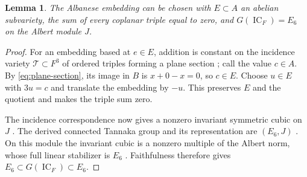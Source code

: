 \documentclass[10pt]{amsart}
\numberwithin{equation}{section}
\newtheorem{lemma}[theorem]{Lemma}
\theoremstyle{remark}
\newcommand{\IC}{\operatorname{IC}}
\newcommand{\cT}{\mathcal T}
\begin{document}
\begin{lemma}\label{lem:normalization}
The Albanese embedding can be chosen with $E\subset A$ an abelian
subvariety, the sum of every coplanar triple equal to zero, and
$G(\IC_F)=E_6$ on the Albert module $J$.
\end{lemma}
\begin{proof}
For an embedding based at $e\in E$, addition is constant on the incidence
variety $\cT\subset F^3$ of ordered triples forming a plane section
\cite{CG1972,Kraemer2022}; call the value $c\in A$.  By
\eqref{eq:plane-section}, its image in $B$ is $x+0-x=0$, so $c\in E$.
Choose $u\in E$ with $3u=c$ and translate the embedding by $-u$.
This preserves $E$ and the quotient and makes the triple sum zero.

The incidence correspondence now gives a nonzero invariant symmetric
cubic on $J$ \cite[Example~2.2(c)]{Kraemer2022}.  The derived connected
Tannaka group and its representation are $(E_6,J)$
\cite[Theorem~2]{Kraemer2016}.  On this module the invariant cubic is a
nonzero multiple of the Albert norm, whose full linear stabilizer is
$E_6$ \cite[Theorem~2.1(c)]{Kraemer2022}.  Faithfulness therefore gives
$E_6\subset G(\IC_F)\subset E_6$.
\end{proof}
\end{document}
